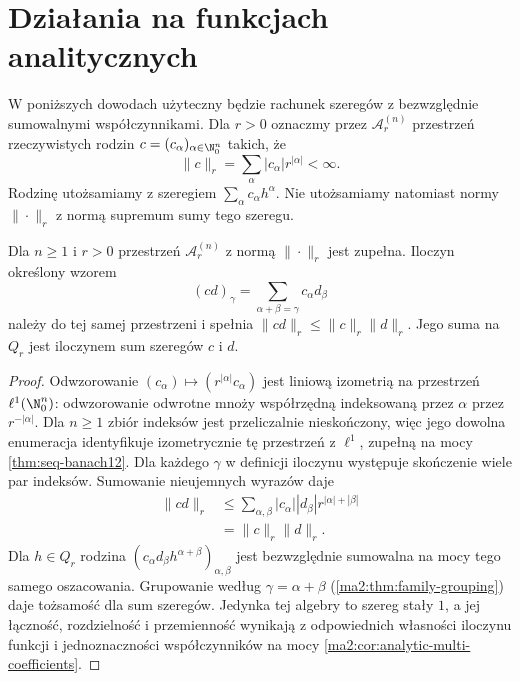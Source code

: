 \section{Działania na funkcjach analitycznych}

W poniższych dowodach użyteczny będzie
rachunek szeregów z bezwzględnie sumowalnymi
współczynnikami. Dla $r>0$ oznaczmy przez
$\mathcal A_r^{(n)}$ przestrzeń rzeczywistych rodzin
$c=(c_\alpha)_{\alpha\in\N_0^n}$ takich, że
\[
 \|c\|_r=\sum_\alpha |c_\alpha|r^{|\alpha|}<\infty.
\]
Rodzinę utożsamiamy z szeregiem $\sum_\alpha c_\alpha h^\alpha$.
Nie utożsamiamy natomiast normy $\|\cdot\|_r$
z normą supremum sumy tego szeregu.

\begin{lemat}
\label{ma2:lem:analytic-series-algebra}
Dla $n\ge1$ i $r>0$ przestrzeń
$\mathcal A_r^{(n)}$ z normą $\|\cdot\|_r$
jest zupełna.
Iloczyn określony wzorem
\[
 (cd)_\gamma=\sum_{\alpha+\beta=\gamma}c_\alpha d_\beta
\]
należy do tej samej przestrzeni i spełnia
$\|cd\|_r\le\|c\|_r\|d\|_r$.
Jego suma na $Q_r$ jest iloczynem sum
szeregów $c$ i $d$.
\end{lemat}
\begin{proof}
Odwzorowanie $(c_\alpha)\mapsto
(r^{|\alpha|}c_\alpha)$ jest liniową izometrią
na przestrzeń $\ell^1(\N_0^n)$:
odwzorowanie odwrotne mnoży współrzędną
indeksowaną przez $\alpha$ przez $r^{- |\alpha|}$.
Dla $n\ge1$
zbiór indeksów jest przeliczalnie nieskończony,
więc jego dowolna enumeracja identyfikuje
izometrycznie tę przestrzeń z $\ell^1$,
zupełną na mocy \ref{thm:seq-banach12}.
Dla każdego $\gamma$ w definicji iloczynu
występuje skończenie wiele par indeksów.
Sumowanie nieujemnych wyrazów daje
\[
 \begin{aligned}
 \|cd\|_r
 &\le \sum_{\alpha,\beta}|c_\alpha||d_\beta|
 r^{|\alpha|+|\beta|}\\
 &=\|c\|_r\|d\|_r .
 \end{aligned}
\]
Dla $h\in Q_r$ rodzina
$(c_\alpha d_\beta h^{\alpha+\beta})_{\alpha,\beta}$
jest bezwzględnie sumowalna na mocy
tego samego oszacowania.
Grupowanie według $\gamma=\alpha+\beta$
(\ref{ma2:thm:family-grouping})
daje tożsamość dla sum szeregów.
Jedynka tej algebry to szereg stały $1$,
a jej łączność, rozdzielność i przemienność wynikają
z odpowiednich własności iloczynu funkcji
i jednoznaczności współczynników na mocy
\ref{ma2:cor:analytic-multi-coefficients}.
\end{proof}

